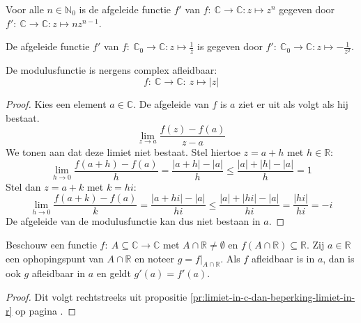 \documentclass[main.tex]{subfiles}
\begin{document}

\begin{vb}
  Voor alle $n \in \mathbb{N}_{0}$ is de afgeleide functie $f'$ van $f:\ \mathbb{C} \rightarrow \mathbb{C}: z \mapsto z^{n}$ gegeven door $f':\ \mathbb{C} \rightarrow \mathbb{C}: z \mapsto nz^{n-1}$.
\end{vb}

\begin{vb}
  De afgeleide functie $f'$ van $f:\ \mathbb{C}_{0} \rightarrow \mathbb{C}: z \mapsto \frac{1}{z}$ is gegeven door $f':\ \mathbb{C}_{0} \rightarrow \mathbb{C}: z \mapsto -\frac{1}{z^{2}}$.
\end{vb}

\begin{tvb}
  De modulusfunctie is nergens complex afleidbaar:
  \[ f:\ \mathbb{C} \rightarrow \mathbb{C}:\ z \mapsto |z| \]

  \begin{proof}
    Kies een element $a\in \mathbb{C}$.
    De afgeleide van $f$ is $a$ ziet er uit als volgt als hij bestaat.
    \[ \lim_{z \rightarrow a}\frac{f(z)-f(a)}{z-a} \]
    We tonen aan dat deze limiet niet bestaat.
    Stel hiertoe $z=a+h$ met $h\in \mathbb{R}$:
    \[ \lim_{h\rightarrow 0}\frac{f(a+h)-f(a)}{h} = \frac{|a+h|-|a|}{h} \le \frac{|a| + |h| - |a|}{h} = 1\]
    Stel dan $z=a+k$ met $k = hi$:
    \[ \lim_{h\rightarrow 0}\frac{f(a+k)-f(a)}{k} = \frac{|a+hi|-|a|}{hi} \le \frac{|a| + |hi| - |a|}{hi} = \frac{|hi|}{hi} = -i \]
    De afgeleide van de modulusfunctie kan dus niet bestaan in $a$.
  \end{proof}
\end{tvb}

\begin{bpr}
  Beschouw een functie $f:\ A \subseteq \mathbb{C} \rightarrow \mathbb{C}$ met $A \cap \mathbb{R} \neq \emptyset$ en $f(A \cap \mathbb{R})\subseteq \mathbb{R}$.
  Zij $a \in \mathbb{R}$ een ophopingspunt van $A \cap \mathbb{R}$ en noteer $g=f|_{A \cap \mathbb{R}}$.
  Als $f$ afleidbaar is in $a$, dan is ook $g$ afleidbaar in $a$ en geldt $g'(a)=f'(a)$.

  \begin{proof}
    Dit volgt rechtstreeks uit propositie \ref{pr:limiet-in-c-dan-beperking-limiet-in-r} op pagina \pageref{pr:limiet-in-c-dan-beperking-limiet-in-r}.
  \end{proof}
\end{bpr}
\end{document}
